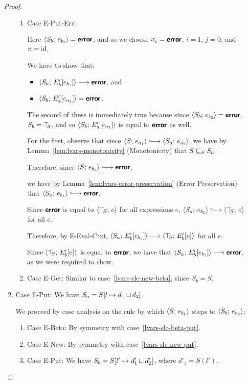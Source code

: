 \begin{proof}
\begin{enumerate}
\begin{enumerate}
    \item \label{lvars-slc-new-put-err}Case {\sc E-Put-Err}:

      Here $\langle S_b;\, e_{b_2} \rangle = \textbf{\textsf{error}}$, and so we choose $\sigma_c
      = \textbf{\textsf{error}}$, $i = 1$, $j = 0$, and $\pi = \mathrm{id}$.

      We have to show that:
      \begin{itemize}
      \item $\langle S_a;\, E'_b\hspace{-0.5mm}\left[e_{b_1}\right] \rangle \longmapsto
        \textbf{\textsf{error}}$, and
      \item $\langle S_b;\, E'_a\hspace{-0.5mm}\left[e_{a_1}\right] \rangle = \textbf{\textsf{error}}$.
      \end{itemize}

      The second of these is immediately true because since
      $\langle S_b;\, e_{b_2} \rangle = \textbf{\textsf{error}}$, $S_b = \top\hspace{-0.85mm}_{S}$, and so
      $\langle S_b;\, E'_a\hspace{-0.5mm}\left[e_{a_1}\right] \rangle$ is equal to $\textbf{\textsf{error}}$ as
      well.

      For the first, observe that since $\config{S}{e_{a_1}}
      \parstepsto \config{S_a}{e_{a_2}}$, we have by
      Lemma~\ref{lem:lvars-monotonicity} (Monotonicity) that
      $S \sqsubseteq_S S_a$.

      Therefore, since $\config{S}{e_{b_1}} \parstepsto \error$,

      we have by Lemma~\ref{lem:lvars-error-preservation} (Error
      Preservation) that $\config{S_a}{e_{b_1}} \parstepsto \error$.

      Since $\textbf{\textsf{error}}$ is equal to $\langle \top\hspace{-0.85mm}_{S};\, e \rangle$ for all
      expressions $e$, $\config{S_a}{e_{b_1}} \parstepsto
      \config{\topS}{e}$ for all $e$.

      Therefore, by {\sc E-Eval-Ctxt},
      $\langle S_a;\, E'_b\hspace{-0.5mm}\left[e_{b_1}\right] \rangle \longmapsto
      \langle \top\hspace{-0.85mm}_{S};\, E'_b\hspace{-0.5mm}\left[e\right] \rangle$ for all $e$.

      Since $\langle \top\hspace{-0.85mm}_{S};\, E'_b\hspace{-0.5mm}\left[e\right] \rangle$ is equal to $\textbf{\textsf{error}}$,
      we have that $\langle S_a;\, E'_b\hspace{-0.5mm}\left[e_{b_1}\right] \rangle \longmapsto
      \textbf{\textsf{error}}$, as we were required to show.

    \item \label{lvars-slc-new-get}Case {\sc E-Get}: Similar to
      case~\ref{lvars-slc-new-beta}, since $S_b = S$.
    \end{enumerate}
  \item Case {\sc E-Put}: We have $S_a =
    S[l \mapsto d_1 \sqcup d_2]$.

    We proceed by case analysis on the rule by which
    $\langle S;\, e_{b_1} \rangle$ steps to $\langle S_b;\, e_{b_2} \rangle$:
    \begin{enumerate}
    \item \label{lvars-slc-put-beta}Case {\sc E-Beta}: By symmetry
      with case~\ref{lvars-slc-beta-put}.
    \item \label{lvars-slc-put-new}Case {\sc E-New}: By symmetry with
      case~\ref{lvars-slc-new-put}.
    \item \label{lvars-slc-put-put}Case {\sc E-Put}: We have $S_b =
      S[l' \mapsto d'_1 \sqcup d'_2]$, where $d'_1 = S(l')$.


\end{enumerate}
\end{enumerate}
\end{proof}

